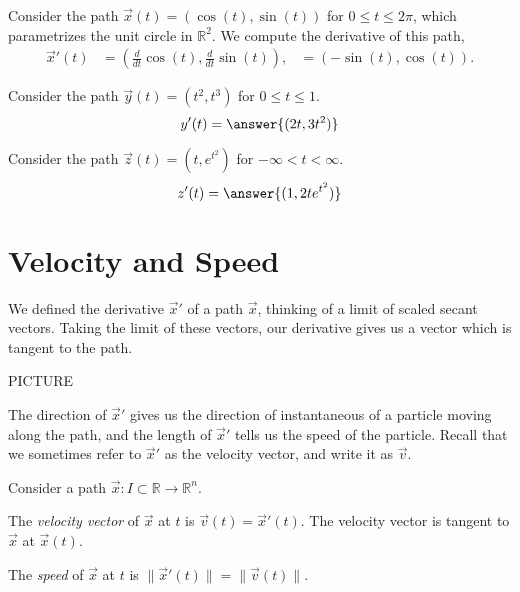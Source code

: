 \documentclass{ximera}
\begin{document}
\begin{example}
Consider the path $\vec{x}(t) = (\cos(t), \sin(t))$ for $0\leq t\leq 2\pi$, which parametrizes the unit circle in $\mathbb{R}^2$. We compute the derivative of this path,
\begin{align*}
\vec{x}'(t) &= \left(\frac{d}{dt}\cos(t), \frac{d}{dt}\sin(t)\right),
&= \left(-\sin(t), \cos(t)\right).
\end{align*}

Consider the path $\vec{y}(t) = (t^2,t^3)$ for $0\leq t\leq 1$.
\[
y'(t) = \answer{(2t, 3t^2)}
\]

Consider the path $\vec{z}(t) = \left(t, e^{t^2}\right)$ for $-\infty < t < \infty$.
\[
z'(t) = \answer{(1, 2te^{t^2})}
\]
\end{example}

\section*{Velocity and Speed}

We defined the derivative $\vec{x}'$ of a path $\vec{x}$, thinking of a limit of scaled secant vectors. Taking the limit of these vectors, our derivative gives us a vector which is tangent to the path.

PICTURE

The direction of $\vec{x}'$ gives us the direction of instantaneous of a particle moving along the path, and the length of $\vec{x}'$ tells us the speed of the particle. Recall that we sometimes refer to $\vec{x}'$ as the velocity vector, and write it as $\vec{v}$.

\begin{definition}
Consider a path $\vec{x}:I\subset\mathbb{R}\rightarrow\mathbb{R}^n$.

The \emph{velocity vector} of $\vec{x}$ at $t$ is $\vec{v}(t) = \vec{x}'(t)$. The velocity vector is tangent to $\vec{x}$ at $\vec{x}(t)$.

The \emph{speed} of $\vec{x}$ at $t$ is $\|\vec{x}'(t)\| = \|\vec{v}(t)\|$.
\end{definition}
\end{document}
